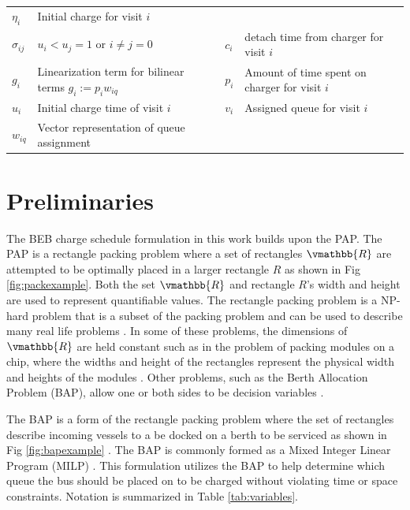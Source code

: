\documentclass[letterpaper, 10pt, conference]{IEEEtran}
\begin{document}
\begin{table}[!t]
\begin{tabular}{l l l l}
			$\eta_i$      & Initial charge for visit $i$                                    \\
			$\sigma_{ij}$ & $u_i < u_j = 1$ \textrm{ or } $i \neq j = 0$                    &
			$c_i$         & detach time from charger for visit $i$                          \\
			$g_i$         & Linearization term for bilinear terms $g_i := p_i w_{iq}$       &
			$p_i$         & Amount of time spent on charger for visit $i$                   \\
			$u_i$         & Initial charge time of visit $i$                                &
			$v_i$         & Assigned queue for visit $i$                                    \\
			$w_{iq}$      & Vector representation of queue assignment                       \\
			\bottomrule
	\end{tabular}
\end{table}

\section{Preliminaries}
\label{sec:preliminaries}
The BEB charge schedule formulation in this work builds upon the PAP. The PAP is a rectangle packing problem where a set of rectangles \(\vmathbb{R}\) are attempted to be optimally placed in a larger rectangle \(R\) as shown in Fig \ref{fig:packexample}. Both the set \(\vmathbb{R}\) and rectangle \(R\)'s width and height are used to represent quantifiable values. The rectangle packing problem is a NP-hard problem that is a subset of the packing problem and can be used to describe many real life problems \cite{Bruin2013,Murata1995}. In some of these problems, the dimensions of \(\vmathbb{R}\) are held constant such as in the problem of packing modules on a chip, where the widths and height of the rectangles represent the physical width and heights of the modules \cite{Murata1995}. Other problems, such as the Berth Allocation Problem (BAP), allow one or both sides to be decision variables \cite{Buhrkal2010}.

The BAP is a form of the rectangle packing problem where the set of rectangles describe incoming vessels to a be docked on a berth to be serviced as shown in Fig \ref{fig:bapexample} \cite{Dai2008}. The BAP is commonly formed as a Mixed Integer Linear Program (MILP) \cite{Frojan2015,Buhrkal2010}. This formulation utilizes the BAP to help determine which queue the bus should be placed on to be charged without violating time or space constraints. Notation is summarized in Table \ref{tab:variables}.
\end{document}
